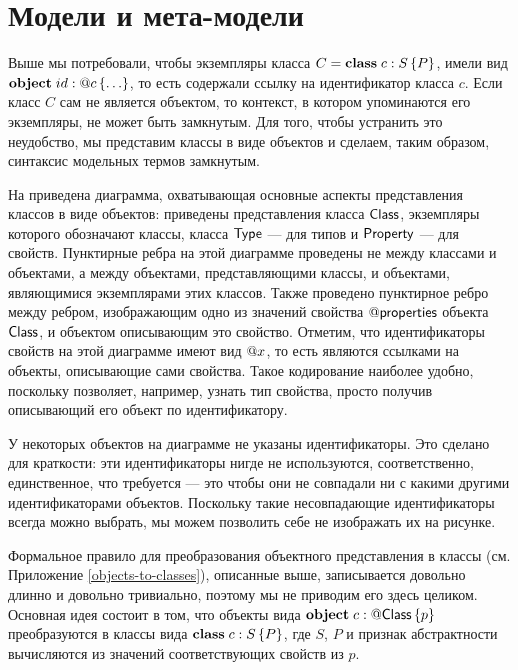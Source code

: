 \section{Модели и мета-модели}\label{models-and-metamodels}

Выше мы потребовали, чтобы экземпляры класса $C = \mathbf{class}\;c : S \left\{P\right\}$, имели вид $\mathbf{object}\;id : @c\left\{ \ldots \right\}$, то есть содержали ссылку на идентификатор класса $c$. Если класс $C$ сам не является объектом, то контекст, в котором упоминаются его экземпляры, не может быть замкнутым. Для того, чтобы устранить это неудобство, мы представим классы в виде объектов и сделаем, таким образом, синтаксис модельных термов замкнутым.

На  приведена диаграмма, охватывающая основные аспекты представления классов в виде объектов: приведены представления класса $\mathsf{Class}$, экземпляры которого обозначают классы, класса $\mathsf{Type}$ --- для типов и $\mathsf{Property}$ --- для свойств. Пунктирные ребра на этой диаграмме проведены не между классами и объектами, а между объектами, представляющими классы, и объектами, являющимися экземплярами этих классов. Также проведено пунктирное ребро между ребром, изображающим одно из значений свойства $@\mathsf{properties}$ объекта $\mathsf{Class}$, и объектом описывающим это свойство.
%
%
%
Отметим, что идентификаторы свойств на этой диаграмме имеют вид $@x$, то есть являются ссылками на объекты, описывающие сами свойства. Такое кодирование наиболее удобно, поскольку позволяет, например, узнать тип свойства, просто получив описывающий его объект по идентификатору.

У некоторых объектов на диаграмме  не указаны идентификаторы. Это сделано для краткости: эти идентификаторы нигде не используются, соответственно, единственное, что требуется --- это чтобы они не совпадали ни с какими другими идентификаторами объектов. Поскольку такие несовпадающие идентификаторы всегда можно выбрать, мы можем позволить себе не изображать их на рисунке.

Формальное правило для преобразования объектного представления в классы (см. Приложение \ref{objects-to-classes}), описанные выше, записывается довольно длинно и довольно тривиально, поэтому мы не приводим его здесь целиком. Основная идея состоит в том, что объекты вида $\mathbf{object}\;c : @\mathsf{Class}\left\{ p \right\}$ преобразуются в классы вида $\mathbf{class}\;c : S \left\{P\right\}$, где $S$, $P$ и признак абстрактности вычисляются из значений соответствующих свойств из $p$.

